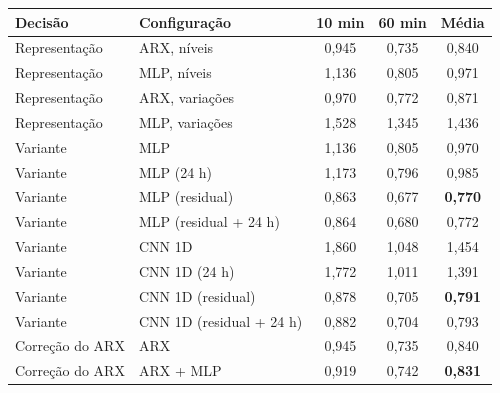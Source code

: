 \begin{tabular}{@{}llccc@{}}
\toprule
Decisão & Configuração & 10 min & 60 min & Média \\
\midrule
Representação & ARX, níveis & 0,945 & 0,735 & 0,840 \\
Representação & MLP, níveis & 1,136 & 0,805 & 0,971 \\
Representação & ARX, variações & 0,970 & 0,772 & 0,871 \\
Representação & MLP, variações & 1,528 & 1,345 & 1,436 \\
\addlinespace
Variante & MLP & 1,136 & 0,805 & 0,970 \\
Variante & MLP (24 h) & 1,173 & 0,796 & 0,985 \\
Variante & MLP (residual) & 0,863 & 0,677 & \textbf{0,770} \\
Variante & MLP (residual + 24 h) & 0,864 & 0,680 & 0,772 \\
Variante & CNN 1D & 1,860 & 1,048 & 1,454 \\
Variante & CNN 1D (24 h) & 1,772 & 1,011 & 1,391 \\
Variante & CNN 1D (residual) & 0,878 & 0,705 & \textbf{0,791} \\
Variante & CNN 1D (residual + 24 h) & 0,882 & 0,704 & 0,793 \\
\addlinespace
Correção do ARX & ARX & 0,945 & 0,735 & 0,840 \\
Correção do ARX & ARX + MLP & 0,919 & 0,742 & \textbf{0,831} \\
\bottomrule
\end{tabular}
